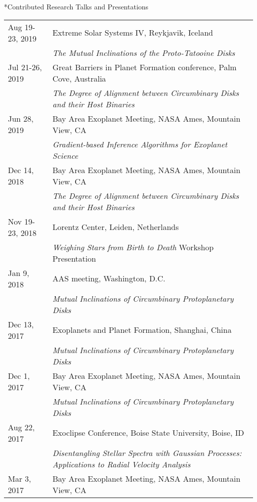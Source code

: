 \documentclass[10pt]{article}
\makeatletter
\newcommand{\rowskip}{1.2mm}
\renewcommand{\section}{\@startsection{section}{1}{0pt}{-\baselineskip}{0.5\baselineskip}{\scshape\color{myblue1}}}
\makeatother
\begin{document}
\section*{Contributed Research Talks and Presentations}
\begin{tabular*}{\textwidth}{@{\hspace{10pt}}p{1.2in}l}
  Aug 19-23, 2019 & Extreme Solar Systems IV, Reykjavik, Iceland\\ 
  & \emph{The Mutual Inclinations of the Proto-Tatooine Disks} \\[\rowskip]
  Jul 21-26, 2019 & Great Barriers in Planet Formation conference, Palm Cove, Australia\\
  & \emph{The Degree of Alignment between Circumbinary Disks and their Host Binaries} \\[\rowskip]
  Jun 28, 2019 & Bay Area Exoplanet Meeting, NASA Ames, Mountain View, CA\\
  & \emph{Gradient-based Inference Algorithms for Exoplanet Science} \\[\rowskip]
  Dec 14, 2018 & Bay Area Exoplanet Meeting, NASA Ames, Mountain View, CA\\
  & \emph{The Degree of Alignment between Circumbinary Disks and their Host Binaries} \\[\rowskip]
  Nov 19-23, 2018 & Lorentz Center, Leiden, Netherlands\\
  & \emph{Weighing Stars from Birth to Death} Workshop Presentation \\[\rowskip]
  Jan 9, 2018 & AAS meeting, Washington, D.C. \\
  & \emph{Mutual Inclinations of Circumbinary Protoplanetary Disks} \\[\rowskip]
  Dec 13, 2017 & Exoplanets and Planet Formation, Shanghai, China \\
  & \emph{Mutual Inclinations of Circumbinary Protoplanetary Disks} \\[\rowskip]
  Dec 1, 2017 & Bay Area Exoplanet Meeting, NASA Ames, Mountain View, CA\\
  & \emph{Mutual Inclinations of Circumbinary Protoplanetary Disks} \\[\rowskip]
  Aug 22, 2017 & Exoclipse Conference, Boise State University, Boise, ID\\
  & \emph{Disentangling Stellar Spectra with Gaussian Processes: Applications to Radial Velocity Analysis} \\[\rowskip]
  Mar 3, 2017 & Bay Area Exoplanet Meeting, NASA Ames, Mountain View, CA\\

\end{tabular*}
\end{document}
